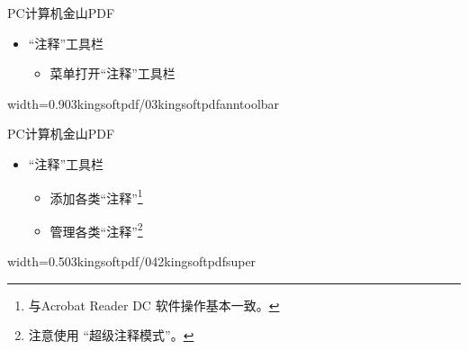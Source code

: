 \documentclass[fontset = none, t, aspectratio=169]{ctexbeamer}
\begin{document}
\begin{frame}{PC计算机}{金山PDF}
  \begin{itemize}
  \item \enquote{注释}工具栏
    \begin{itemize}
    \item {}菜单打开\enquote{注释}工具栏
    \end{itemize}
  \end{itemize}
  \begin{center}
    \begin{annotationimage}{width=0.9\textwidth}{03kingsoftpdf/03kingsoftpdfanntoolbar}
    \end{annotationimage}
  \end{center}
\end{frame}

\begin{frame}{PC计算机}{金山PDF}
  \begin{itemize}
  \item \enquote{注释}工具栏
    \begin{itemize}
    \item 添加各类\enquote{注释}\footnote[frame,1]{与Acrobat Reader DC
        软件操作基本一致。}
    \item 管理各类\enquote{注释}\footnote[frame,2]{注意使用
        \enquote{\alert{超级注释模式}}。}
    \end{itemize}
  \end{itemize}
  \begin{center}
    \begin{annotationimage}{width=0.5\textwidth}{03kingsoftpdf/042kingsoftpdfsuper}
    \end{annotationimage}
  \end{center}
\end{frame}
\end{document}
